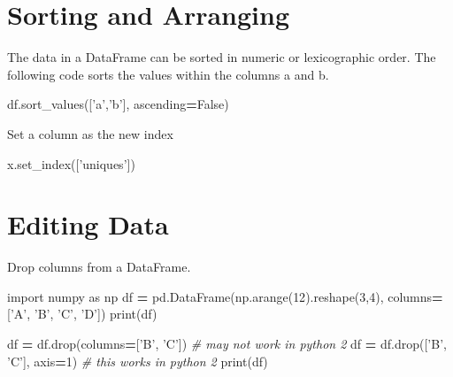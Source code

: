 \documentclass[]{book}
\newenvironment{Shaded}{\begin{snugshade}}{\end{snugshade}}
\newcommand{\DecValTok}[1]{\textcolor[rgb]{0.00,0.00,0.81}{#1}}
\newcommand{\StringTok}[1]{\textcolor[rgb]{0.31,0.60,0.02}{#1}}
\newcommand{\ImportTok}[1]{#1}
\newcommand{\CommentTok}[1]{\textcolor[rgb]{0.56,0.35,0.01}{\textit{#1}}}
\newcommand{\VariableTok}[1]{\textcolor[rgb]{0.00,0.00,0.00}{#1}}
\newcommand{\OperatorTok}[1]{\textcolor[rgb]{0.81,0.36,0.00}{\textbf{#1}}}
\newcommand{\BuiltInTok}[1]{#1}
\newcommand{\NormalTok}[1]{#1}
\begin{document}
\section{Sorting and Arranging}\label{sorting-and-arranging}

The data in a DataFrame can be sorted in numeric or lexicographic order.
The following code sorts the values within the columns a and b.

\begin{Shaded}
\begin{Highlighting}[]
\NormalTok{df.sort_values([}\StringTok{'a'}\NormalTok{,}\StringTok{'b'}\NormalTok{], ascending}\OperatorTok{=}\VariableTok{False}\NormalTok{)}
\end{Highlighting}
\end{Shaded}

Set a column as the new index

\begin{Shaded}
\begin{Highlighting}[]
\NormalTok{x.set_index([}\StringTok{'uniques'}\NormalTok{])}
\end{Highlighting}
\end{Shaded}

\section{Editing Data}\label{editing-data}

Drop columns from a DataFrame.

\begin{Shaded}
\begin{Highlighting}[]
\ImportTok{import}\NormalTok{ numpy }\ImportTok{as}\NormalTok{ np}
\NormalTok{df }\OperatorTok{=}\NormalTok{ pd.DataFrame(np.arange(}\DecValTok{12}\NormalTok{).reshape(}\DecValTok{3}\NormalTok{,}\DecValTok{4}\NormalTok{),}
\NormalTok{                    columns}\OperatorTok{=}\NormalTok{[}\StringTok{'A'}\NormalTok{, }\StringTok{'B'}\NormalTok{, }\StringTok{'C'}\NormalTok{, }\StringTok{'D'}\NormalTok{])}
\BuiltInTok{print}\NormalTok{(df)}

\NormalTok{df }\OperatorTok{=}\NormalTok{ df.drop(columns}\OperatorTok{=}\NormalTok{[}\StringTok{'B'}\NormalTok{, }\StringTok{'C'}\NormalTok{]) }\CommentTok{# may not work in python 2}
\NormalTok{df }\OperatorTok{=}\NormalTok{ df.drop([}\StringTok{'B'}\NormalTok{, }\StringTok{'C'}\NormalTok{], axis}\OperatorTok{=}\DecValTok{1}\NormalTok{) }\CommentTok{# this works in python 2}
\BuiltInTok{print}\NormalTok{(df)}
\end{Highlighting}
\end{Shaded}
\end{document}
